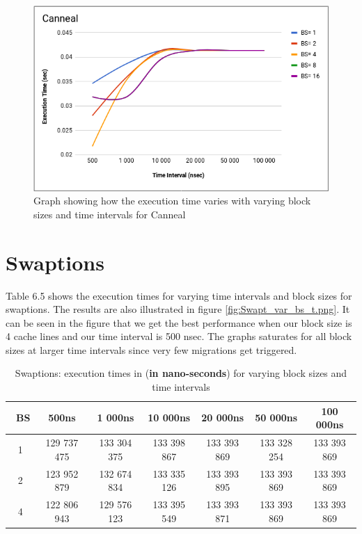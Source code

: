 \documentclass{listhesis}
\begin{document}
\begin{figure}
  \includegraphics[width=\linewidth]{cann_var_bs_t.png}
  \centering
  \caption{Graph showing how the execution time varies with varying block sizes and time intervals for Canneal}
  \label{fig:cann_var_bs_t.png}
\end{figure}

\section{Swaptions}
Table 6.5 shows the execution times for varying time intervals and block sizes for swaptions. The results are also illustrated in figure \ref{fig:Swapt_var_bs_t.png}. It can be seen in the figure that we get the best performance when our block size is 4 cache lines and our time interval is 500 nsec. The graphs saturates for all block sizes at larger time intervals since very few migrations get triggered. 

\begin{table}[h!]
\begin{center}
 \begin{tabular}{|| c | c | c| c | c | c | c||} 
 \hline
 \ \textbf{BS}  & \textbf{500ns}  & \textbf{1 000ns} & \textbf{10 000ns} & \textbf{20 000ns} & \textbf{50 000ns} & \textbf{100 000ns}\\ [0.5 ex] 
 \hline\hline
   1 & 129 737 475 &  133 304 375 & 133 398 867 & 133 393 869 & 133 328 254 &  133 393 869 \\ 
 \hline
   2 & 123 952 879 & 132 674 834 & 133 335 126 & 133 393 895 & 133 393 869 & 133 393 869 \\
 \hline
   4 & 122 806 943 & 129 576 123 & 133 395 549 & 133 393 871 & 133 393 869 & 133 393 869 \\
 \hline
\end{tabular}
 \caption{Swaptions: execution times in (\textbf{in nano-seconds}) for varying block sizes and time intervals}
 \label{table:ExecTimes3}
\end{center}
\end{table}
\end{document}
